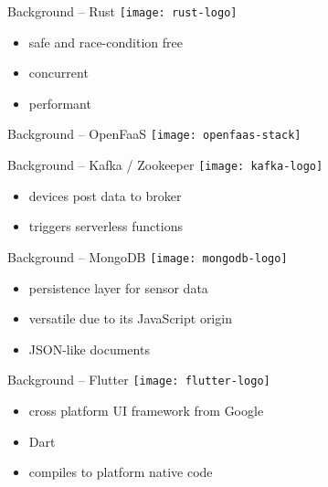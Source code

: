 \documentclass[aspectratio=1610]{beamer}
\begin{document}
  \begin{frame}{Background -- Rust}
    \texttt{[image: rust-logo]}

    \vspace*{1.5em}

    \begin{itemize}
      \item safe and race-condition free
      \item concurrent
      \item performant
    \end{itemize}
  \end{frame}

  \begin{frame}{Background -- OpenFaaS}
    \texttt{[image: openfaas-stack]}
  \end{frame}

  \begin{frame}{Background -- Kafka / Zookeeper}
    \texttt{[image: kafka-logo]}

    \vspace*{1.5em}

    \begin{itemize}
      \item devices post data to broker
      \item triggers serverless functions
    \end{itemize}
  \end{frame}

  \begin{frame}{Background -- MongoDB}
    \texttt{[image: mongodb-logo]}

    \vspace*{1.5em}

    \begin{itemize}
      \item persistence layer for sensor data
      \item versatile due to its JavaScript origin
      \item JSON-like documents
    \end{itemize}
  \end{frame}

  \begin{frame}{Background -- Flutter}
    \texttt{[image: flutter-logo]}

    \vspace*{2em}

    \begin{itemize}
      \item cross platform UI framework from Google
      \item Dart
      \item compiles to platform native code
    \end{itemize}
  \end{frame}
\end{document}
